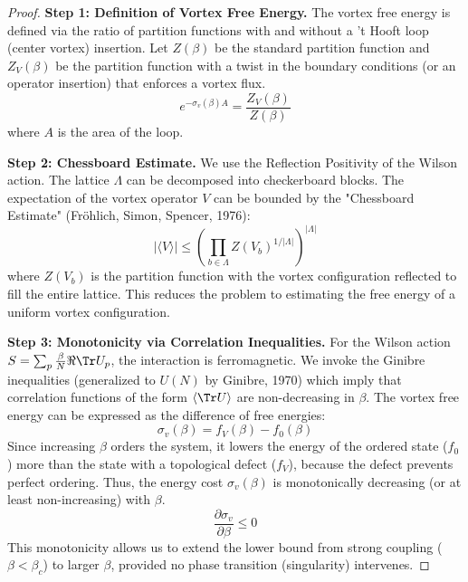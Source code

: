 \begin{proof}
\textbf{Step 1: Definition of Vortex Free Energy.}
The vortex free energy is defined via the ratio of partition functions with and without a 't Hooft loop (center vortex) insertion. Let $Z(\beta)$ be the standard partition function and $Z_V(\beta)$ be the partition function with a twist in the boundary conditions (or an operator insertion) that enforces a vortex flux.
\begin{equation}
e^{-\sigma_v(\beta) A} = \frac{Z_V(\beta)}{Z(\beta)}
\end{equation}
where $A$ is the area of the loop.

\textbf{Step 2: Chessboard Estimate.}
We use the Reflection Positivity of the Wilson action. The lattice $\Lambda$ can be decomposed into checkerboard blocks.
The expectation of the vortex operator $V$ can be bounded by the "Chessboard Estimate" (Fröhlich, Simon, Spencer, 1976):
\begin{equation}
|\langle V \rangle| \leq \left( \prod_{b \in \Lambda} Z(V_b)^{1/|\Lambda|} \right)^{|\Lambda|}
\end{equation}
where $Z(V_b)$ is the partition function with the vortex configuration reflected to fill the entire lattice.
This reduces the problem to estimating the free energy of a uniform vortex configuration.

\textbf{Step 3: Monotonicity via Correlation Inequalities.}
For the Wilson action $S = \sum_p \frac{\beta}{N} \Re \Tr U_p$, the interaction is ferromagnetic.
We invoke the Ginibre inequalities (generalized to $U(N)$ by Ginibre, 1970) which imply that correlation functions of the form $\langle \Tr U \rangle$ are non-decreasing in $\beta$.
The vortex free energy can be expressed as the difference of free energies:
\begin{equation}
\sigma_v(\beta) = f_V(\beta) - f_0(\beta)
\end{equation}
Since increasing $\beta$ orders the system, it lowers the energy of the ordered state ($f_0$) more than the state with a topological defect ($f_V$), because the defect prevents perfect ordering.
Thus, the energy cost $\sigma_v(\beta)$ is monotonically decreasing (or at least non-increasing) with $\beta$.
\begin{equation}
\frac{\partial \sigma_v}{\partial \beta} \leq 0
\end{equation}
This monotonicity allows us to extend the lower bound from strong coupling ($\beta < \beta_c$) to larger $\beta$, provided no phase transition (singularity) intervenes.
\end{proof}

